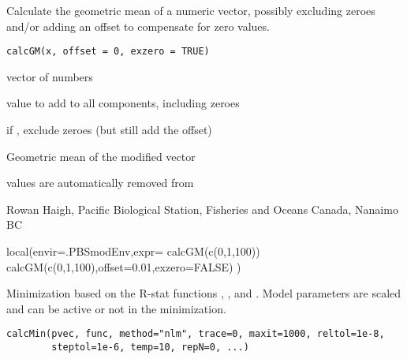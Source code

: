 \documentclass[letterpaper]{book}
\begin{document}
%
\begin{Description}\relax
Calculate the geometric mean of a numeric 
vector, possibly excluding zeroes and/or adding an offset 
to compensate for zero values.
\end{Description}
%
\begin{Usage}
\begin{verbatim}
calcGM(x, offset = 0, exzero = TRUE)
\end{verbatim}
\end{Usage}
%
\begin{Arguments}
\begin{ldescription}
\item[\code{x}] vector of numbers
\item[\code{offset}] value to add to all components, including zeroes
\item[\code{exzero}] if , exclude zeroes (but still add the offset)
\end{ldescription}
\end{Arguments}
%
\begin{Value}
Geometric mean of the modified vector 
\end{Value}
%
\begin{Note}\relax
{} values are automatically removed from 
\end{Note}
%
\begin{Author}\relax
Rowan Haigh, Pacific Biological Station, Fisheries and Oceans Canada, Nanaimo BC
\end{Author}
%
\begin{Examples}
\begin{ExampleCode}
local(envir=.PBSmodEnv,expr={
  calcGM(c(0,1,100))
  calcGM(c(0,1,100),offset=0.01,exzero=FALSE)
})
\end{ExampleCode}
\end{Examples}
%
\begin{Description}\relax
Minimization based on the R-stat functions , , and .
Model parameters are scaled and can be active or not in the minimization.
\end{Description}
%
\begin{Usage}
\begin{verbatim}
calcMin(pvec, func, method="nlm", trace=0, maxit=1000, reltol=1e-8,
        steptol=1e-6, temp=10, repN=0, ...)
\end{verbatim}
\end{Usage}
\end{document}
